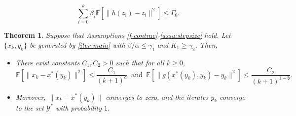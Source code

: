 \documentclass[10pt,a4paper]{amsart}
\newtheorem{theorem}{Theorem}
\newcommand{\EE}{\mathbb{E}}
\newcommand{\Ystar}{\mathcal{Y}^*}
\newcommand{\afrak}{\mathfrak{a}}
\newcommand{\bfrak}{\mathfrak{b}}
\newcommand{\xstar}{x^*}
\begin{document}
\begin{equation}\label{bound_h-z_i-1}
    \sum_{i=0}^k\beta_i\EE\left[\|h(z_i)-z_i\|^2\right]\leq \Gamma_6.
\end{equation}

\begin{theorem}\label{thm:main}
    Suppose that Assumptions \ref{f-contrac}-\ref{assu:stepsize} hold. Let $\{x_k,y_k\}$ be generated by \eqref{iter-main} with $\beta/\alpha\leq \gamma_1$ and $K_1\geq \gamma_2$. Then, 
    \begin{itemize}
        \item  There exist constants $C_1,C_2>0$ such that for all $k\geq 0$,
        $$\EE\left[\|x_k-\xstar(y_k)\|^2\right]\leq \frac{C_1}{(k+1)^\afrak} \;\;\text{and}\;\; \EE\left[\|g(\xstar(y_k),y_k)-y_k\|^2\right]\leq \frac{C_2}{(k+1)^{1-\bfrak}}.$$
    \item Moreover, $\|x_k-\xstar(y_k)\|$ converges to zero, and the iterates $y_k$ converge to the set $\Ystar$ with probability $1$.
    \end{itemize}
\end{theorem}
\end{document}
